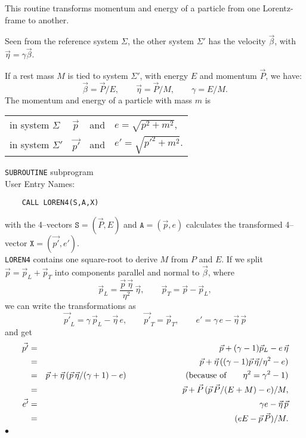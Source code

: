                         
                             
                     
                
This routine transforms momentum and energy of a particle from one
Lorentz-frame to another.
\par
Seen from the reference system $\Sigma$, the other system
$\Sigma '$ has the velocity $\vec{\beta}$, with
$\vec{\eta} = \gamma \vec{\beta}$.
\par
If a rest mass $M$ is tied to system $\Sigma '$, with energy $E$
and momentum $\vec{P}$, we have:
$$\vec{\beta} = \vec{P}/E, \qquad \vec{\eta} = \vec{P}/M, \qquad
\gamma = E/M. $$
The momentum and energy of a particle with mass $m$ is \\[1mm]
\begin{tabular}{l@{\quad : \quad}lll}
in system $\Sigma$   &  $\vec{p}$   & and  & $e = \sqrt{p^2+m^2}$,\\
in system $\Sigma'$  &  $\vec{p'}$  & and  & $e' = \sqrt{{p'}^2+m^2}$.
\end{tabular}
\Structure
{\tt SUBROUTINE} subprogram \\
User Entry Names: 
\Usage
\begin{verbatim}
    CALL LOREN4(S,A,X)
\end{verbatim}
with the 4--vectors $\mathtt{S} = (\vec{P},E)$ and
$\mathtt{A} = (\vec{p},e)$
calculates the transformed 4--vector $\mathtt{X} = (\vec{p'},e')$. \\
{\tt LOREN4} contains one square-root to derive $M$ from $P$ and $E$.
\Method
If we split $\vec{p} = \vec{p}_L + \vec{p}_T$
into components parallel and normal to $\vec{\beta}$, where
$$ \vec{p}_L = \displaystyle \frac{\vec{p}\, \vec{\eta}}{\eta^2}\,
 \vec{\eta}, \qquad \vec{p}_T = \vec{p}-\vec{p}_L,$$
we can write the transformations as
$$ \vec{p'}_L = \gamma \, \vec{p}_L-\vec{\eta} \,e, \qquad
 \vec{p'}_T = \vec{p}_T, \qquad e' = \gamma \,e - \vec{\eta}\,\vec{p}$$
and get
\begin{eqnarray*}
\vec{p'} & = & \vec{p} + (\gamma -1)\vec{p}_L- e\,\vec{\eta} \\
 & = & \vec{p} + \vec{\eta} \, ((\gamma-1)\vec{p}\,\vec{\eta}/\eta^2
  - e) \\
 & = & \vec{p} + \vec{\eta}\, (\vec{p}\,\vec{\eta}/(\gamma+1) - e)
\hspace{25mm} \mbox{(because of} \qquad \eta^2 = \gamma^2 -1) \\
 & = & \vec{p} + \vec{P}\, (\vec{p}\,\vec{P}/(E+M) -e)/M,\\
\vec{e'} & = & \gamma e - \vec{\eta}\,\vec{p} \\
         & = & ( eE-\vec{p}\,\vec{P})/M.
\end{eqnarray*}
$\bullet$
